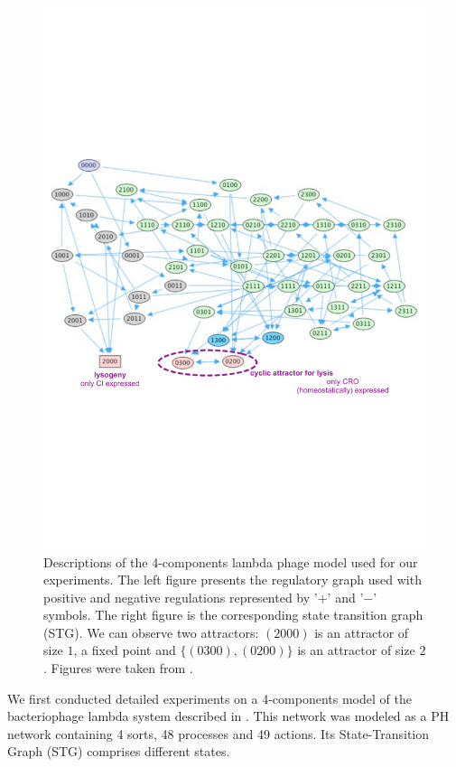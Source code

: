 \begin{figure}[h]
  \includegraphics{figures/lampdaphage-STG.pdf}
  \caption{\label{fig:lambda-graph} 
    Descriptions of the 4-components lambda phage model used for our experiments.
    The left figure presents the regulatory graph used with positive and negative regulations represented by ’$+$’ and ’$-$’ symbols.
    The right figure is the corresponding state transition graph (STG).%
    We can observe two attractors: $(2000)$ is an attractor of size $1$, \ie a fixed point and $\{(0300), (0200)\}$ is an attractor of size $2$.
    Figures were taken from \cite{thieffry1995dynamical,chaouiya2008petri}.
  }
\end{figure}

We first conducted detailed experiments on a 4-components model of the bacteriophage lambda system described in  \cite{thieffry1995dynamical}.
This network was modeled as a PH network containing 4 sorts, 48 processes and 49 actions.
Its State-Transition Graph (STG) comprises  different states.

